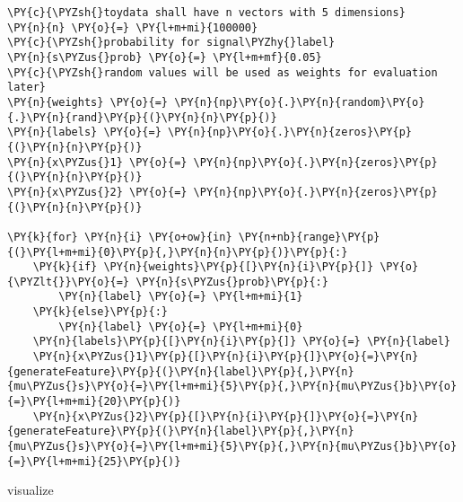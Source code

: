 {\par%
\vspace{-1\baselineskip}%
}%
\begin{notebookcell}[]%
\begin{addmargin}[\cellleftmargin]{0em}%
{\smaller%
\par%
%
\vspace{-1\smallerfontscale}%
\begin{Verbatim}[commandchars=\\\{\}]
\PY{c}{\PYZsh{}toydata shall have n vectors with 5 dimensions}
\PY{n}{n} \PY{o}{=} \PY{l+m+mi}{100000}
\PY{c}{\PYZsh{}probability for signal\PYZhy{}label}
\PY{n}{s\PYZus{}prob} \PY{o}{=} \PY{l+m+mf}{0.05}
\PY{c}{\PYZsh{}random values will be used as weights for evaluation later}
\PY{n}{weights} \PY{o}{=} \PY{n}{np}\PY{o}{.}\PY{n}{random}\PY{o}{.}\PY{n}{rand}\PY{p}{(}\PY{n}{n}\PY{p}{)}
\PY{n}{labels} \PY{o}{=} \PY{n}{np}\PY{o}{.}\PY{n}{zeros}\PY{p}{(}\PY{n}{n}\PY{p}{)}
\PY{n}{x\PYZus{}1} \PY{o}{=} \PY{n}{np}\PY{o}{.}\PY{n}{zeros}\PY{p}{(}\PY{n}{n}\PY{p}{)}
\PY{n}{x\PYZus{}2} \PY{o}{=} \PY{n}{np}\PY{o}{.}\PY{n}{zeros}\PY{p}{(}\PY{n}{n}\PY{p}{)}

\PY{k}{for} \PY{n}{i} \PY{o+ow}{in} \PY{n+nb}{range}\PY{p}{(}\PY{l+m+mi}{0}\PY{p}{,}\PY{n}{n}\PY{p}{)}\PY{p}{:}
    \PY{k}{if} \PY{n}{weights}\PY{p}{[}\PY{n}{i}\PY{p}{]} \PY{o}{\PYZlt{}}\PY{o}{=} \PY{n}{s\PYZus{}prob}\PY{p}{:}
        \PY{n}{label} \PY{o}{=} \PY{l+m+mi}{1}
    \PY{k}{else}\PY{p}{:}
        \PY{n}{label} \PY{o}{=} \PY{l+m+mi}{0}
    \PY{n}{labels}\PY{p}{[}\PY{n}{i}\PY{p}{]} \PY{o}{=} \PY{n}{label}
    \PY{n}{x\PYZus{}1}\PY{p}{[}\PY{n}{i}\PY{p}{]}\PY{o}{=}\PY{n}{generateFeature}\PY{p}{(}\PY{n}{label}\PY{p}{,}\PY{n}{mu\PYZus{}s}\PY{o}{=}\PY{l+m+mi}{5}\PY{p}{,}\PY{n}{mu\PYZus{}b}\PY{o}{=}\PY{l+m+mi}{20}\PY{p}{)}
    \PY{n}{x\PYZus{}2}\PY{p}{[}\PY{n}{i}\PY{p}{]}\PY{o}{=}\PY{n}{generateFeature}\PY{p}{(}\PY{n}{label}\PY{p}{,}\PY{n}{mu\PYZus{}s}\PY{o}{=}\PY{l+m+mi}{5}\PY{p}{,}\PY{n}{mu\PYZus{}b}\PY{o}{=}\PY{l+m+mi}{25}\PY{p}{)}
\end{Verbatim}
%
\par%
\vspace{-1\smallerfontscale}}%
\end{addmargin}
\end{notebookcell}


    visualize


